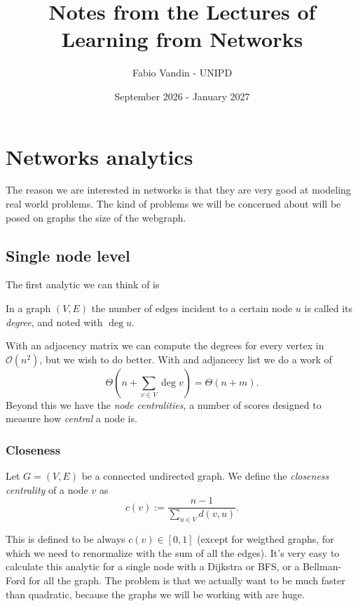 \documentclass[11pt]{scrartcl}
\newcommand{\bigo}[1]{\mathcal{O}\!\left(#1\right)}
\newcommand{\bigtheta}[1]{\Theta\!\left(#1\right)}
\begin{document}
	\title{
		Notes from the Lectures of \\
		Learning from Networks
		}
	\subtitle{Fabio Vandin - UNIPD}
	\date{September 2026 - January 2027}
	
	\maketitle
	
	\tableofcontents
	
	\newpage
	
	\section{Networks analytics}
	
	The reason we are interested in networks is that they are very good at modeling real world problems. The kind of problems we will be concerned about will be posed on graphs the size of the webgraph.
	
	\subsection{Single node level}
	
	The first analytic we can think of is
	\begin{definition}
		In a graph $(V,E)$ the number of edges incident to a certain node $u$ is called its \textit{degree}, and noted with $\deg u$.
	\end{definition}
	With an adjacency matrix we can compute the degrees for every vertex in $\bigo{n^2}$, but we wish to do better. With and adjancecy list we do a work of
	$$\bigtheta{n+\sum_{v\in V}\deg v}=\bigtheta{n+m}.$$
	Beyond this we have the \textit{node centralities}, a number of scores designed to measure how \textit{central} a node is.
	
	\subsubsection{Closeness}
	
	\begin{definition}
		Let $G=(V,E)$ be a connected undirected graph. We define the \textit{closeness centrality} of a node $v$ as 
		$$c(v):=\frac{n-1}{\sum_{u\in V}d(v,u)}.$$
	\end{definition}
	This is defined to be always $c(v)\in [0,1]$ (except for weigthed graphs, for which we need to renormalize with the sum of all the edges). It's very easy to calculate this analytic for a single node with a Dijkstra or BFS, or a Bellman-Ford for all the graph. The problem is that we actually want to be much faster than quadratic, because the graphs we will be working with are huge. 
	
\end{document}
